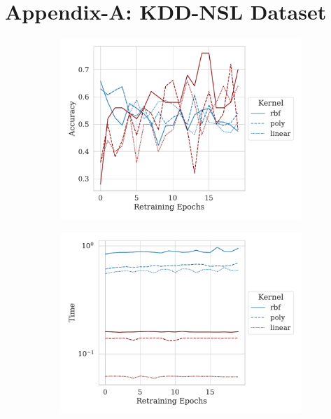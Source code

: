 
\section{Appendix-A: KDD-NSL Dataset}
\label{appendix-1}
\begin{figure}[h!]
     \centering
     \begin{subfigure}{0.47\textwidth}
         \centering
         \includegraphics[width=\textwidth]{./kdd-nsl/retrain_accuracy.pdf}
     \end{subfigure}
     \hfill
     \begin{subfigure}{0.47\textwidth}
         \centering
         \includegraphics[width=\textwidth]{./kdd-nsl/retrain_time.pdf}
     \end{subfigure}

\end{figure}
